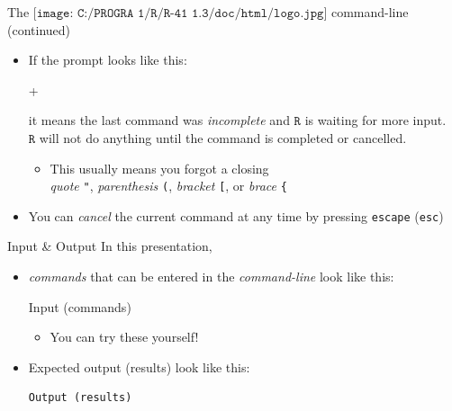 \documentclass[
  ignorenonframetext,
]{beamer}
\newenvironment{Shaded}{\begin{snugshade}}{\end{snugshade}}
\newcommand{\AlertTok}[1]{\textcolor[rgb]{0.94,0.16,0.16}{#1}}
\newcommand{\NormalTok}[1]{#1}
\newcommand{\StringTok}[1]{\textcolor[rgb]{0.31,0.60,0.02}{#1}}
\providecommand{\tightlist}{%
  \setlength{\itemsep}{0pt}\setlength{\parskip}{0pt}}
\begin{document}
\begin{frame}[fragile]{The
\(\texttt{[image: C:/PROGRA~1/R/R-41~1.3/doc/html/logo.jpg]}\)
command-line (continued)}
\protect\hypertarget{the-includegraphicsheight1emcprogra1rr-411.3dochtmllogo.jpg-command-line-continued}{}
\begin{itemize}
\item
  If the prompt looks like this:

\begin{Shaded}
\begin{Highlighting}[]
\NormalTok{+}
\end{Highlighting}
\end{Shaded}

  it means the last command was \emph{incomplete} and \(\texttt{R}\) is
  waiting for more input.\\
  \(\texttt{R}\) will not do anything until the command is completed or
  cancelled.

  \begin{itemize}
  \tightlist
  \item
    This usually means you forgot a closing\\
    \emph{quote} \AlertTok{\texttt{"}}, \emph{parenthesis}
    \AlertTok{\texttt{(}}, \emph{bracket} \AlertTok{\texttt{[}}, or
    \emph{brace} \AlertTok{\texttt{\{}}
  \end{itemize}
\item
  \StringTok{You can \textit{cancel} the current command at any time by pressing \texttt{escape}}
  (\AlertTok{\texttt{esc}})
\end{itemize}
\end{frame}

\begin{frame}[fragile]{Input \& Output}
\protect\hypertarget{input-output}{}
In this presentation,

\begin{itemize}
\item
  \emph{commands} that can be entered in the \emph{command-line} look
  like this:

\begin{Shaded}
\begin{Highlighting}[]
\NormalTok{Input (commands)}
\end{Highlighting}
\end{Shaded}

  \begin{itemize}
  \tightlist
  \item
    You can try these yourself!
  \end{itemize}
\item
  Expected output (results) look like this:

\begin{verbatim}
Output (results)
\end{verbatim}
\end{itemize}
\end{frame}
\end{document}
